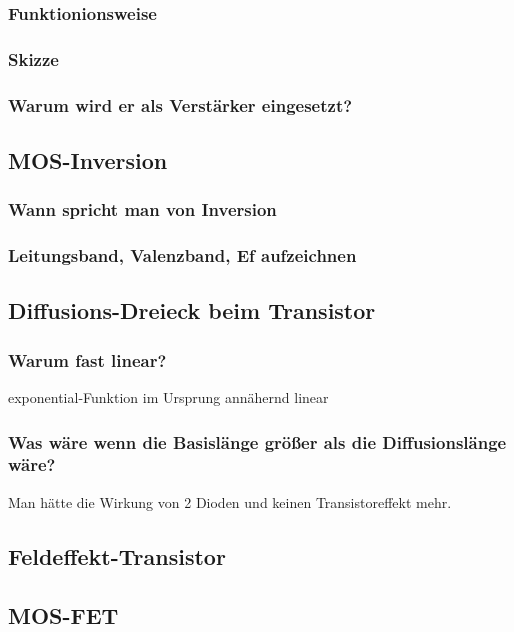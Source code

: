 \documentclass{article}
\begin{document}
    \subsubsection{Funktionionsweise}
    \subsubsection{Skizze}
    \subsubsection{Warum wird er als Verst\"arker eingesetzt?}
\subsection{MOS-Inversion}\label{k6:mosInversion}

    \subsubsection{Wann spricht man von Inversion}
    \subsubsection{Leitungsband, Valenzband, Ef aufzeichnen}

\subsection{Diffusions-Dreieck beim Transistor}\label{k6:diffusionsdreieck}
    \subsubsection{Warum fast linear?} exponential-Funktion im Ursprung ann\"ahernd linear
    \subsubsection{Was w\"are wenn die Basisl\"ange gr\"o{\ss}er als die Diffusionsl\"ange w\"are?} Man h\"atte die Wirkung von 2 Dioden und keinen Transistoreffekt mehr.

\subsection{Feldeffekt-Transistor}\label{k6:fet}

\subsection{MOS-FET}\label{k6:mosfet}
\end{document}
